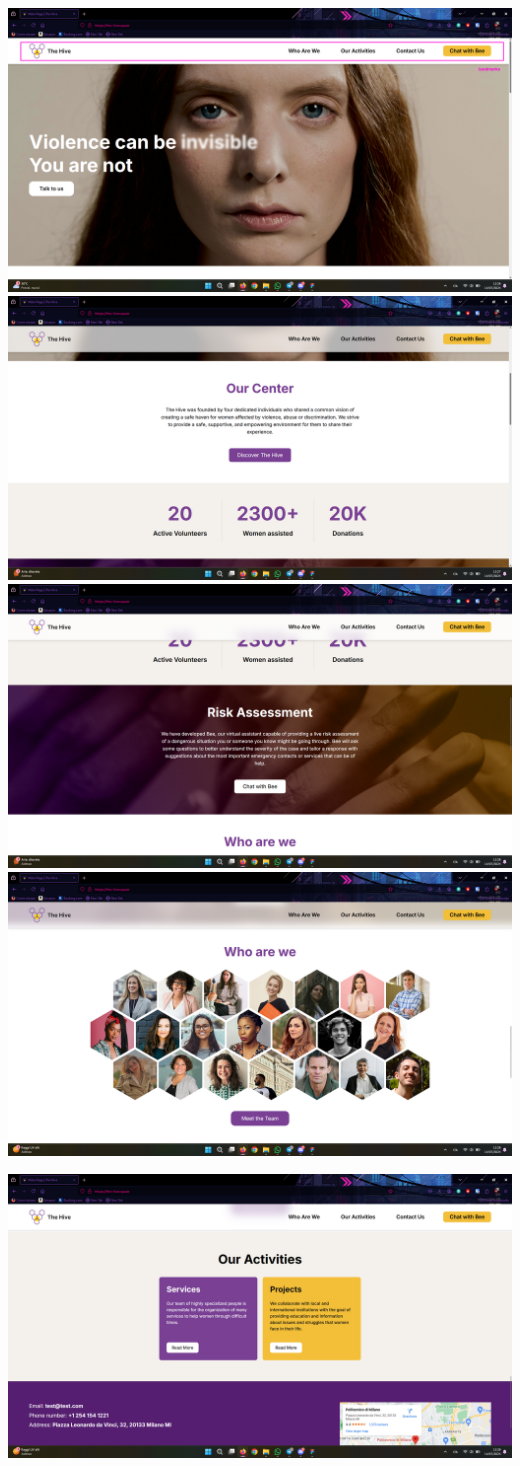 \includegraphics[width=0.5\linewidth]{img/design-document/website-screenshots/homepage-1.png}
\includegraphics[width=0.5\linewidth]{img/design-document/website-screenshots/homepage-2.png}
\includegraphics[width=0.5\linewidth]{img/design-document/website-screenshots/homepage-3.png}
\includegraphics[width=0.5\linewidth]{img/design-document/website-screenshots/homepage-4.png}
\begin{center}
    \includegraphics[width=0.5\linewidth]{img/design-document/website-screenshots/homepage-5.png}   
\end{center}

